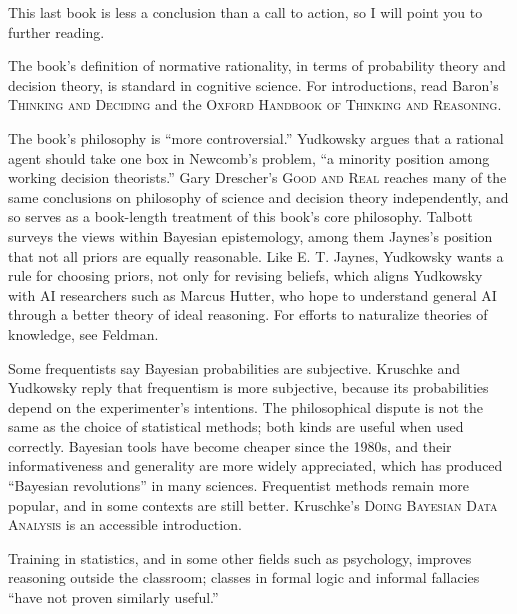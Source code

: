 
This last book is less a conclusion than a call to action, so I will point you to further reading.

The book's definition of normative rationality, in terms of probability theory and decision theory, is standard in cognitive science. For introductions, read Baron's \textsc{Thinking and Deciding} and the \textsc{Oxford Handbook of Thinking and Reasoning}.

The book's philosophy is ``more controversial.'' Yudkowsky argues that a rational agent should take one box in Newcomb's problem, ``a minority position among working decision theorists.''  Gary Drescher's \textsc{Good and Real} reaches many of the same conclusions on philosophy of science and decision theory independently, and so serves as a book-length treatment of this book's core philosophy. Talbott surveys the views within Bayesian epistemology, among them Jaynes's position that not all priors are equally reasonable. Like E. T. Jaynes, Yudkowsky wants a rule for choosing priors, not only for revising beliefs, which aligns Yudkowsky with AI researchers such as Marcus Hutter, who hope to understand general AI through a better theory of ideal reasoning. For efforts to naturalize theories of knowledge, see Feldman.

Some frequentists say Bayesian probabilities are subjective. Kruschke and Yudkowsky reply that frequentism is more subjective, because its probabilities depend on the experimenter's intentions.  The philosophical dispute is not the same as the choice of statistical methods; both kinds are useful when used correctly. Bayesian tools have become cheaper since the 1980s, and their informativeness and generality are more widely appreciated, which has produced ``Bayesian revolutions'' in many sciences. Frequentist methods remain more popular, and in some contexts are still better. Kruschke's \textsc{Doing Bayesian Data Analysis} is an accessible introduction.

Training in statistics, and in some other fields such as psychology, improves reasoning outside the classroom; classes in formal logic and informal fallacies ``have not proven similarly useful.'' 

